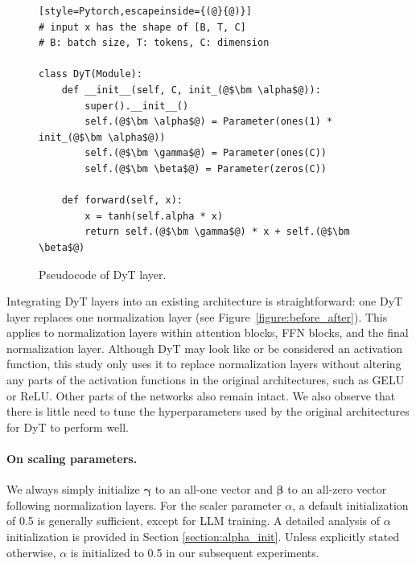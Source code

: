 \begin{figure}
\centering
\begin{minipage}{\linewidth}
\vspace*{-0.85cm}
\begin{algorithm}[H]
\begin{lstlisting}[style=Pytorch,escapeinside={(@}{@)}]
# input x has the shape of [B, T, C]
# B: batch size, T: tokens, C: dimension 

class DyT(Module):
    def __init__(self, C, init_(@$\bm \alpha$@)):
        super().__init__()
        self.(@$\bm \alpha$@) = Parameter(ones(1) * init_(@$\bm \alpha$@))
        self.(@$\bm \gamma$@) = Parameter(ones(C))
        self.(@$\bm \beta$@) = Parameter(zeros(C))

    def forward(self, x):
        x = tanh(self.alpha * x)
        return self.(@$\bm \gamma$@) * x + self.(@$\bm \beta$@)
\end{lstlisting}
\caption{Pseudocode of DyT layer.}
\label{algorithm:dyt-pytorch}
\end{algorithm}
\end{minipage}
\end{figure}
Integrating DyT layers into an existing architecture is straightforward: one DyT layer replaces one normalization layer (see Figure~\ref{figure:before_after}). This applies to normalization layers within attention blocks, FFN blocks, and the final normalization layer. Although DyT may look like or be considered an activation function, this study only uses it to replace normalization layers without altering any parts of the activation functions in the original architectures, such as GELU or ReLU. Other parts of the networks also remain intact. We also observe that there is little need to tune the hyperparameters used by the original architectures for DyT to perform well.


\vskip 0.2cm
\paragraph{On scaling parameters.} We always simply initialize $\bm{\gamma}$ to an all-one vector and $\bm{\beta}$ to an all-zero vector following normalization layers. For the scaler parameter $\alpha$, a default initialization of 0.5 is generally sufficient, except for LLM training.
A detailed analysis of $\alpha$ initialization is provided in Section \ref{section:alpha_init}.
Unless explicitly stated otherwise, $\alpha$ is initialized to 0.5 in our subsequent experiments.

